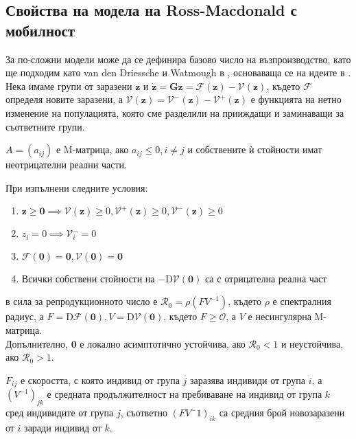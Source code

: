 \subsection{Свойства на модела на Ross-Macdonald с мобилност}
За по-сложни модели може да се дефинира базово число на възпроизводство, като ще подходим като van den Driessche и Watmough в \cite{Driessche2002}, основаваща се на идеите в \cite{Diekmann1990}.
Нека имаме групи от заразени $\mathbf{z}$ и $\dot{\mathbf{z}} = \mathbf{G}{\mathbf{z}} = \mathscr{F}(\mathbf{z}) - \mathscr{V}(\mathbf{z})$, където $\mathscr{F}$ определя новите заразени, а $\mathscr{V}(\mathbf{z}) = \mathscr{V}^-(\mathbf{z}) - \mathscr{V}^+(\mathbf{z})$ е функцията на нетно изменение на популацията, която сме разделили на прииждащи и заминаващи за съответните групи.

\begin{definition}[M-матрица]
  $A = (a_{ij})$ е M-матрица, ако $a_{ij} \leq 0, i \neq j$ и собствените ѝ стойности имат неотрицателни реални части.
\end{definition}

\begin{theorem}
  При изпълнени следните условия:
  \begin{enumerate}
    \item $\mathbf{z} \geq \mathbf{0} \implies \mathscr{V}(\mathbf{z}) \geq 0, \mathscr{V}^+(\mathbf{z}) \geq 0, \mathscr{V}^-(\mathbf{z}) \geq 0$
    \item $z_i = 0 \implies \mathscr{V}_{i}^- = 0$
    \item $\mathscr{F}(\mathbf{0}) = \mathbf{0}, \mathscr{V}(\mathbf{0}) = \mathbf{0}$
    \item Всички собствени стойности на $-\mathrm{D}\mathscr{V}{(\boldsymbol{0})}$ са с отрицателна реална част
    \end{enumerate}
  в сила за репродукционното число е $\mathscr{R}_0 = \rho(F V^{-1})$, където $\rho$ е спектралния радиус, а $F = \mathrm{D} \mathscr{F}(\mathbf{0}), V = \mathrm{D} \mathscr{V}(\mathbf{0})$, където $F \geq \mathscr{O}$, а $V$ е несингулярна M-матрица. \\
  Допълнително, $\mathbf{0}$ е локално асимптотично устойчива, ако $\mathscr{R}_0 < 1$ и неустойчива, ако $\mathscr{R}_0 > 1$.
\end{theorem}

$F_{ij}$ е скоростта, с която индивид от група $j$ заразява индивиди от група $i$, а $(V^{-1})_{jk}$ е средната продължителност на пребиваване на индивид от група $k$ сред индивидите от група $j$, съответно $(F V^-1)_{ik}$ са средния брой новозаразени от $i$ заради индивид от $k$.

